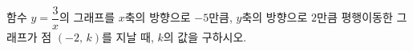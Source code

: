 \hspace*{2mm}\begin{minipage}[t]{\dimexpr\linewidth-2mm\relax}\vspace{0pt}
함수 $y=\dfrac{3}{x}$의 그래프를 $x$축의 방향으로 $-5$만큼, $y$축의 방향으로 $2$만큼 평행이동한 그래프가 점 $(-2,\,k)$를 지날 때, $k$의 값을 구하시오.\end{minipage}
